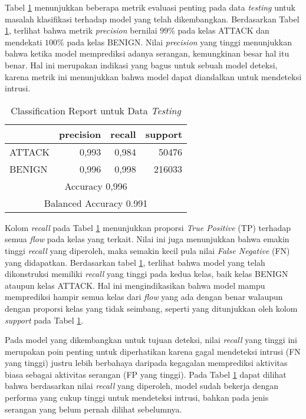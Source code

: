 \documentclass[a4paper,12pt]{report}
\begin{document}
Tabel \ref{classification_report} menunjukkan beberapa metrik evaluasi penting pada data \textit{testing} untuk masalah klasifikasi terhadap model yang telah dikembangkan. Berdasarkan Tabel \ref{classification_report}, terlihat bahwa metrik \textit{precision} bernilai  $99\%$ pada kelas ATTACK dan mendekati $100\%$ pada kelas BENIGN.  Nilai \textit{precision} yang tinggi menunjukkan bahwa ketika model memprediksi adanya serangan, kemungkinan besar hal itu benar. Hal ini merupakan indikasi yang bagus untuk sebuah model deteksi, karena metrik ini menunjukkan bahwa model dapat diandalkan untuk mendeteksi intrusi. 
\begin{table}[h!]
	\centering
	\caption{Classification Report untuk Data \textit{Testing}}
	\label{classification_report}
	\begin{tabular}{|l|r|r|r|}
		\hline
		& \textbf{precision} & \textbf{recall} & \textbf{support} \\
		\hline
		ATTACK & 0,993 & 0,984 & 50476 \\
		\hline
		BENIGN & 0,996 & 0,998 & 216033 \\
		\hline
		\multicolumn{4}{|c|}{Accuracy \hfill 0,996} \\
		\hline
		\multicolumn{4}{|c|}{Balanced Accuracy \hfill 0.991} \\
		\hline
	\end{tabular}
\end{table}

Kolom \textit{recall} pada Tabel \ref{classification_report} menunjukkan proporsi \textit{True Positive} (TP) terhadap semua \textit{flow} pada kelas yang terkait. Nilai ini juga menunjukkan bahwa emakin tinggi \textit{recall} yang diperoleh, maka semakin kecil pula nilai \textit{False Negative} (FN) yang didapatkan.  Berdasarkan tabel \ref{classification_report}, terlihat bahwa model yang telah dikonstruksi memiliki \textit{recall} yang tinggi pada kedua kelas, baik kelas BENIGN ataupun kelas ATTACK. Hal ini mengindikasikan bahwa model mampu memprediksi hampir semua kelas dari \textit{flow} yang ada dengan benar walaupun dengan proporsi kelas yang tidak seimbang, seperti yang ditunjukkan oleh kolom \textit{support} pada Tabel \ref{classification_report}. 

Pada model yang dikembangkan untuk tujuan deteksi, nilai \textit{recall} yang tinggi ini merupakan poin penting untuk diperhatikan karena gagal mendeteksi intrusi (FN yang tinggi) justru lebih berbahaya daripada kegagalan memprediksi aktivitas biasa sebagai aktivitas serangan (FP yang tinggi). Pada Tabel \ref{classification_report} dapat dilihat bahwa berdasarkan nilai \textit{recall} yang diperoleh, model sudah bekerja dengan performa yang cukup tinggi untuk mendeteksi intrusi, bahkan pada jenis serangan yang belum pernah dilihat sebelumnya.
\end{document}
